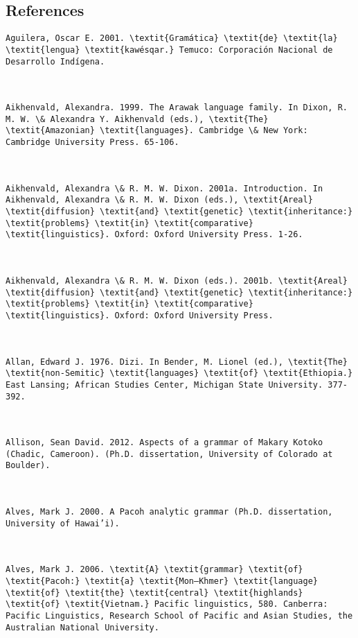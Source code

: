 \subsection{References}
\begin{verbatim}
Aguilera, Oscar E. 2001. \textit{Gramática} \textit{de} \textit{la} \textit{lengua} \textit{kawésqar.} Temuco: Corporación Nacional de Desarrollo Indígena.



Aikhenvald, Alexandra. 1999. The Arawak language family. In Dixon, R. M. W. \& Alexandra Y. Aikhenvald (eds.), \textit{The} \textit{Amazonian} \textit{languages}. Cambridge \& New York: Cambridge University Press. 65-106.



Aikhenvald, Alexandra \& R. M. W. Dixon. 2001a. Introduction. In Aikhenvald, Alexandra \& R. M. W. Dixon (eds.), \textit{Areal} \textit{diffusion} \textit{and} \textit{genetic} \textit{inheritance:} \textit{problems} \textit{in} \textit{comparative} \textit{linguistics}. Oxford: Oxford University Press. 1-26.



Aikhenvald, Alexandra \& R. M. W. Dixon (eds.). 2001b. \textit{Areal} \textit{diffusion} \textit{and} \textit{genetic} \textit{inheritance:} \textit{problems} \textit{in} \textit{comparative} \textit{linguistics}. Oxford: Oxford University Press.



Allan, Edward J. 1976. Dizi. In Bender, M. Lionel (ed.), \textit{The} \textit{non-Semitic} \textit{languages} \textit{of} \textit{Ethiopia.} East Lansing; African Studies Center, Michigan State University. 377-392.



Allison, Sean David. 2012. Aspects of a grammar of Makary Kotoko (Chadic, Cameroon). (Ph.D. dissertation, University of Colorado at Boulder).



Alves, Mark J. 2000. A Pacoh analytic grammar (Ph.D. dissertation, University of Hawai’i).



Alves, Mark J. 2006. \textit{A} \textit{grammar} \textit{of} \textit{Pacoh:} \textit{a} \textit{Mon–Khmer} \textit{language} \textit{of} \textit{the} \textit{central} \textit{highlands} \textit{of} \textit{Vietnam.} Pacific linguistics, 580. Canberra: Pacific Linguistics, Research School of Pacific and Asian Studies, the Australian National University.




\end{verbatim}
